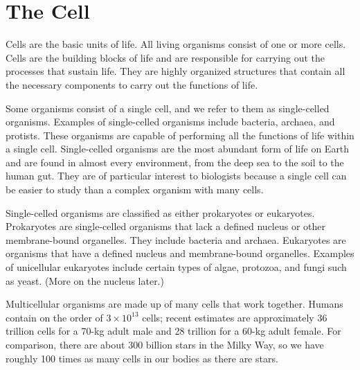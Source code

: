 \section{The Cell}

Cells are the basic units of life.
\reversemarginpar
{}
\normalmarginpar
All living organisms consist of one or more cells. Cells are the building blocks of life and are responsible for carrying out the processes that sustain life. They are highly organized structures that contain all the necessary components to carry out the functions of life. 

Some organisms consist of a single cell, and we refer to them as single-celled organisms. Examples of single-celled organisms include bacteria, archaea, and protists. These organisms are capable of performing all the functions of life within a single cell. Single-celled organisms are the most abundant form of life on Earth and are found in almost every environment, from the deep sea to the soil to the human gut. They are of particular interest to biologists because a single cell can be easier to study than a complex organism with many cells. 

Single-celled organisms 
are classified as either prokaryotes or eukaryotes. Prokaryotes are single-celled organisms that lack a defined nucleus or other membrane-bound organelles.
%
%
They include bacteria and archaea. Eukaryotes are organisms that have a defined nucleus and membrane-bound organelles. Examples of unicellular eukaryotes include certain types of algae, protozoa, and fungi such as yeast. (More on the nucleus later.)

Multicellular organisms are made up of many cells that work together. Humans contain on the order of \(3 \times 10^{13}\) cells; recent estimates are approximately 36 trillion cells for a 70-kg adult male and 28 trillion for a 60-kg adult female.
For comparison, there are about 300 billion stars in the Milky Way, so we have roughly 100 times as many cells in our bodies as there are stars.

